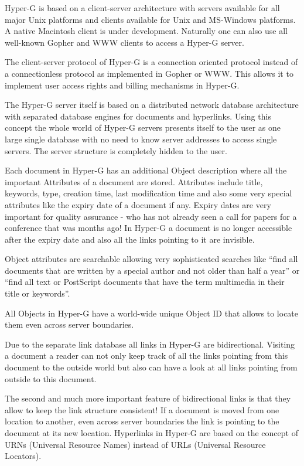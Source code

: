 Hyper-G is based on a client-server architecture with servers
available for all major Unix platforms and clients available for Unix
and MS-Windows platforms. A native Macintosh client is under
development. Naturally one can also use all well-known Gopher and WWW
clients to access a Hyper-G server.

The client-server protocol of Hyper-G is a connection oriented
protocol instead of a connectionless protocol as implemented in Gopher
or WWW. This allows it to implement user access rights and billing
mechanisms in Hyper-G.

The Hyper-G server itself is based on a distributed network database
architecture with separated database engines for documents and
hyperlinks. Using this concept the whole world of Hyper-G servers
presents itself to the user as one large single database with no need
to know server addresses to access single servers. The server
structure is completely hidden to the user. 

Each document in Hyper-G has an additional Object description where
all the important Attributes of a document are stored. Attributes
include title, keywords, type, creation time, last modification time
and also some very special attributes like the expiry date of a
document if any. Expiry dates are very important for quality assurance
- who has not already seen a call for papers for a conference that was
months ago! In Hyper-G a document is no longer accessible after the
expiry date and also all the links pointing to it are invisible.

Object attributes are searchable allowing very sophisticated searches
like ``find all documents that are written by a special author and not
older than half a year'' or ``find all text or PostScript documents
that have the term multimedia in their title or keywords''.

All Objects in Hyper-G have a world-wide unique Object ID that allows
to locate them even across server boundaries.

Due to the separate link database all links in Hyper-G are
bidirectional. Visiting a document a reader can not only keep track of
all the links pointing from this document to the outside world but
also can have a look at all links pointing from outside to this
document. 

The second and much more important feature of bidirectional links is
that they allow to keep the link structure consistent! If a document
is moved from one location to another, even across server boundaries
the link is pointing to the document at its new location. Hyperlinks
in Hyper-G are based on the concept of URNs (Universal Resource Names)
instead of URLs (Universal Resource Locators).


